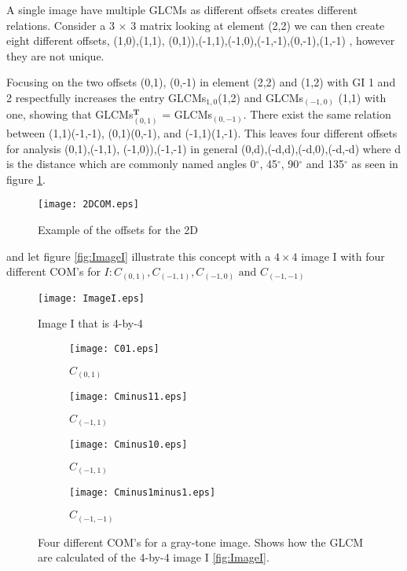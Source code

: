 A single image have multiple GLCMs as different offsets creates different relations. Consider a 3 $\times$ 3 matrix looking at element (2,2) we can then create eight different offsets, {(1,0),(1,1), (0,1)),(-1,1),(-1,0),(-1,-1),(0,-1),(1,-1)} , however they are not unique. 

Focusing on the two offsets {(0,1), (0,-1)} in element (2,2) and (1,2) with GI 1 and 2 respectfully increases the entry GLCMs$_{1,0}$(1,2) and GLCMs$_({-1,0})$ (1,1) with one, showing that GLCMs$_{(0,1)}^\textbf{T}$ = GLCMs$_{(0,-1)}$. There exist the same relation between (1,1)(-1,-1), (0,1)(0,-1), and (-1,1)(1,-1). This leaves four different offsets for analysis {(0,1),(-1,1), (-1,0)),(-1,-1)} in general {(0,d),(-d,d),(-d,0),(-d,-d)} where d is the distance which are commonly named angles 0$^\circ$, 45$^\circ$, 90$^\circ$ and 135$^\circ$ as seen in figure \ref{2DCOM}.

\begin{figure}[H]
  \centering
  \texttt{[image: 2DCOM.eps]}
  \caption{Example of the offsets for the 2D}\label{2DCOM}
\end{figure}

and let figure \ref{fig:ImageI} illustrate this concept with a $4 \times 4$ image I with four different COM's for $I: C_{(0,1)}, C_{(-1,1)}, C_{(-1,0)} \text{ and } C_{(-1,-1)}$

\begin{figure}[H]
  \centering
  \texttt{[image: ImageI.eps]}
  \caption{Image I that is 4-by-4}\label{fig:ImageI}
    \begin{subfigure}{.24\textwidth}
      \centering
      \texttt{[image: C01.eps]}
      \caption{$C_{(0,1)}$}\label{fig:c01}
    \end{subfigure}
    \begin{subfigure}{.24\textwidth}
      \centering
      \texttt{[image: Cminus11.eps]}
      \caption{$C_{(-1,1)}$}\label{fig:cminus11}
    \end{subfigure}
    \begin{subfigure}{.24\textwidth}
      \centering
      \texttt{[image: Cminus10.eps]}
      \caption{$C_{(-1,1)}$}\label{fig:cminus10}
    \end{subfigure}
    \begin{subfigure}{.24\textwidth}
      \centering
      \texttt{[image: Cminus1minus1.eps]}
      \caption{$C_{(-1,-1)}$}\label{fig:cminus1minus1}
    \end{subfigure}
    \caption{Four different COM's for a gray-tone image. Shows how the GLCM are calculated of the 4-by-4 image I \ref{fig:ImageI}.}
\end{figure}

